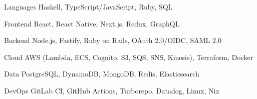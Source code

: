 
\begin{cvskills}

  \cvskill
    {Languages}
    {Haskell, TypeScript/JavaScript, Ruby, SQL}

  \cvskill
    {Frontend}
    {React, React Native, Next.js, Redux, GraphQL}

  \cvskill
    {Backend}
    {Node.js, Fastify, Ruby on Rails, OAuth 2.0/OIDC, SAML 2.0}

  \cvskill
    {Cloud}
    {AWS (Lambda, ECS, Cognito, S3, SQS, SNS, Kinesis), Terraform, Docker}

  \cvskill
    {Data}
    {PostgreSQL, DynamoDB, MongoDB, Redis, Elasticsearch}

  \cvskill
    {DevOps}
    {GitLab CI, GitHub Actions, Turborepo, Datadog, Linux, Nix}

\end{cvskills}
